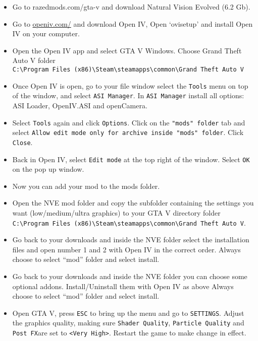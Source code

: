 \documentclass[
  openany]{book}
\begin{document}
\begin{itemize}
\item
  Go to razedmods.com/gta-v and download Natural Vision Evolved (6.2 Gb).
\item
  Go to \href{https://openiv.com/}{openiv.com/} and download Open IV, Open `ovisetup' and install Open IV on your computer.
\item
  Open the Open IV app and select GTA V Windows. Choose Grand Theft Auto V folder \texttt{C:\textbackslash{}Program\ Files\ (x86)\textbackslash{}Steam\textbackslash{}steamapps\textbackslash{}common\textbackslash{}Grand\ Theft\ Auto\ V}
\item
  Once Open IV is open, go to your file window select the \texttt{Tools} menu on top of the window, and select \texttt{ASI\ Manager}. In \texttt{ASI\ Manager} install all options: ASI Loader, OpenIV.ASI and openCamera.
\item
  Select \texttt{Tools} again and click \texttt{Options}. Click on the \texttt{"mods"\ folder} tab and select \texttt{Allow\ edit\ mode\ only\ for\ archive\ inside\ "mods"\ folder}. Click \texttt{Close}.
\item
  Back in Open IV, select \texttt{Edit\ mode} at the top right of the window. Select \texttt{OK} on the pop up window.
\item
  Now you can add your mod to the mods folder.
\item
  Open the NVE mod folder and copy the subfolder containing the settings you want (low/medium/ultra graphics) to your GTA V directory folder \texttt{C:\textbackslash{}Program\ Files\ (x86)\textbackslash{}Steam\textbackslash{}steamapps\textbackslash{}common\textbackslash{}Grand\ Theft\ Auto\ V}.
\item
  Go back to your downloads and inside the NVE folder select the installation files and open number 1 and 2 with Open IV in the correct order. Always choose to select ``mod'' folder and select install.
\item
  Go back to your downloads and inside the NVE folder you can choose some optional addons. Install/Uninstall them with Open IV as above Always choose to select ``mod'' folder and select install.
\item
  Open GTA V, press \texttt{ESC} to bring up the menu and go to \texttt{SETTINGS}. Adjust the graphics quality, making sure \texttt{Shader\ Quality}, \texttt{Particle\ Quality} and \texttt{Post\ FX}are set to \texttt{\textless{}Very\ High\textgreater{}}. Restart the game to make change in effect.
\end{itemize}
\end{document}
